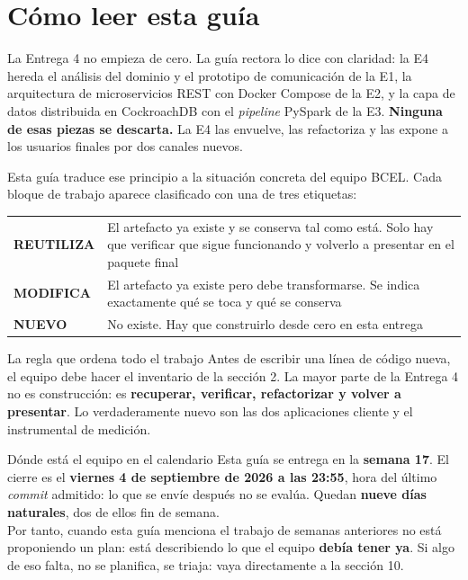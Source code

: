 \documentclass[11pt,a4paper]{article}
\newcommand{\reuso}{\cellcolor{filaReuso}\textbf{REUTILIZA}}
\newcommand{\cambia}{\cellcolor{filaCambia}\textbf{MODIFICA}}
\newcommand{\nuevo}{\cellcolor{filaNuevo}\textbf{NUEVO}}
\begin{document}
\tableofcontents
\newpage

\section{Cómo leer esta guía}

La Entrega 4 no empieza de cero. La guía rectora lo dice con claridad: la E4 hereda el análisis del dominio y el prototipo de comunicación de la E1, la arquitectura de microservicios REST con Docker Compose de la E2, y la capa de datos distribuida en CockroachDB con el \emph{pipeline} PySpark de la E3. \textbf{Ninguna de esas piezas se descarta.} La E4 las envuelve, las refactoriza y las expone a los usuarios finales por dos canales nuevos.

Esta guía traduce ese principio a la situación concreta del equipo BCEL. Cada bloque de trabajo aparece clasificado con una de tres etiquetas:

\begin{center}
	\small
	\begin{tabular}{@{}p{2.6cm}p{12.6cm}@{}}
		\toprule
		\reuso & El artefacto ya existe y se conserva tal como está. Solo hay que verificar que sigue funcionando y volverlo a presentar en el paquete final \\
		\addlinespace
		\cambia & El artefacto ya existe pero debe transformarse. Se indica exactamente qué se toca y qué se conserva \\
		\addlinespace
		\nuevo & No existe. Hay que construirlo desde cero en esta entrega \\
		\bottomrule
	\end{tabular}
\end{center}

\begin{uteqbox}{La regla que ordena todo el trabajo}
	Antes de escribir una línea de código nueva, el equipo debe hacer el inventario de la sección 2. La mayor parte de la Entrega 4 no es construcción: es \textbf{recuperar, verificar, refactorizar y volver a presentar}. Lo verdaderamente nuevo son las dos aplicaciones cliente y el instrumental de medición.
\end{uteqbox}

\begin{pisoBox}{Dónde está el equipo en el calendario}
	Esta guía se entrega en la \textbf{semana 17}. El cierre es el \textbf{viernes 4 de septiembre de 2026 a las 23:55}, hora del último \emph{commit} admitido: lo que se envíe después no se evalúa. Quedan \textbf{nueve días naturales}, dos de ellos fin de semana.\\[5pt]
	Por tanto, cuando esta guía menciona el trabajo de semanas anteriores no está proponiendo un plan: está describiendo lo que el equipo \textbf{debía tener ya}. Si algo de eso falta, no se planifica, se triaja: vaya directamente a la sección 10.
\end{pisoBox}
\end{document}

